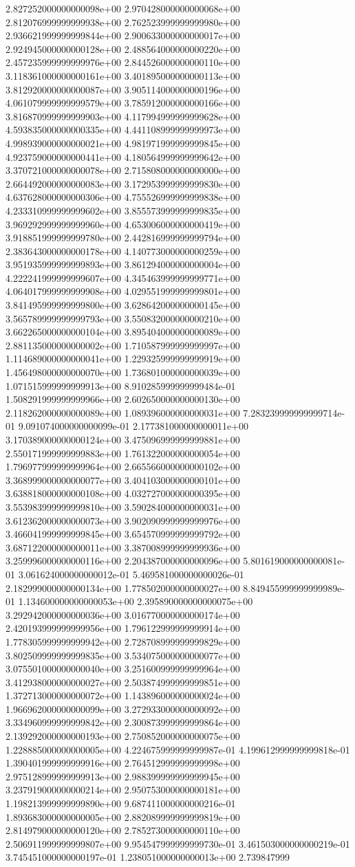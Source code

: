 2.827252000000000098e+00	2.970428000000000068e+00	2.812076999999999938e+00	2.762523999999999980e+00	2.936621999999999844e+00	2.900633000000000017e+00	2.924945000000000128e+00	2.488564000000000220e+00	2.457235999999999976e+00	2.844526000000000110e+00	3.118361000000000161e+00	3.401895000000000113e+00	3.812920000000000087e+00	3.905114000000000196e+00	4.061079999999999579e+00	3.785912000000000166e+00	3.816870999999999903e+00	4.117994999999999628e+00	4.593835000000000335e+00	4.441108999999999973e+00	4.998939000000000021e+00	4.981971999999999845e+00	4.923759000000000441e+00	4.180564999999999642e+00	3.370721000000000078e+00	2.715808000000000000e+00	2.664492000000000083e+00	3.172953999999999830e+00	4.637628000000000306e+00	4.755526999999999838e+00	4.233310999999999602e+00	3.855573999999999835e+00	3.969292999999999960e+00	4.653006000000000419e+00	3.918851999999999780e+00	2.442816999999999794e+00	2.383643000000000178e+00	4.140773000000000259e+00	3.951935999999999893e+00	3.861294000000000004e+00	4.222241999999999607e+00	4.345463999999999771e+00	4.064017999999999908e+00	4.029551999999999801e+00	3.841495999999999800e+00	3.628642000000000145e+00	3.565789999999999793e+00	3.550832000000000210e+00	3.662265000000000104e+00	3.895404000000000089e+00	2.881135000000000002e+00	1.710587999999999997e+00	1.114689000000000041e+00	1.229325999999999919e+00	1.456498000000000070e+00	1.736801000000000039e+00	1.071515999999999913e+00	8.910285999999999484e-01	1.508291999999999966e+00	2.602650000000000130e+00	2.118262000000000089e+00	1.089396000000000031e+00	7.283239999999999714e-01	9.091074000000000099e-01	2.177381000000000011e+00	3.170389000000000124e+00	3.475096999999999881e+00	2.550171999999999883e+00	1.761322000000000054e+00	1.796977999999999964e+00	2.665566000000000102e+00	3.368999000000000077e+00	3.404103000000000101e+00	3.638818000000000108e+00	4.032727000000000395e+00	3.553983999999999810e+00	3.590284000000000031e+00	3.612362000000000073e+00	3.902090999999999976e+00	3.466041999999999845e+00	3.654570999999999792e+00	3.687122000000000011e+00	3.387008999999999936e+00	3.259996000000000116e+00	2.204387000000000096e+00	5.801619000000000081e-01	3.061624000000000012e-01	5.469581000000000026e-01	2.182999000000000134e+00	1.778502000000000027e+00	8.849455999999999989e-01	1.134600000000000053e+00	2.395890000000000075e+00	3.292942000000000036e+00	3.016770000000000174e+00	2.420193999999999956e+00	1.796122999999999914e+00	1.778305999999999942e+00	2.728708999999999829e+00	3.802509999999999835e+00	3.534075000000000077e+00	3.075501000000000040e+00	3.251600999999999964e+00	3.412938000000000027e+00	2.503874999999999851e+00	1.372713000000000072e+00	1.143896000000000024e+00	1.966962000000000099e+00	3.272933000000000092e+00	3.334960999999999842e+00	2.300873999999999864e+00	2.139292000000000193e+00	2.750852000000000075e+00	1.228885000000000005e+00	4.224675999999999987e-01	4.199612999999999818e-01	1.390401999999999916e+00	2.764512999999999998e+00	2.975128999999999913e+00	2.988399999999999945e+00	3.237919000000000214e+00	2.950753000000000181e+00	1.198213999999999890e+00	9.687411000000000216e-01	1.893683000000000005e+00	2.882089999999999819e+00	2.814979000000000120e+00	2.785273000000000110e+00	2.506911999999999807e+00	9.954547999999999730e-01	3.461503000000000219e-01	3.745451000000000197e-01	1.238051000000000013e+00	2.739847999